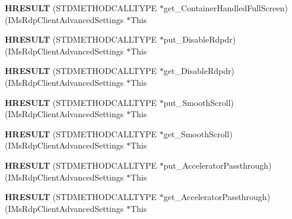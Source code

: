 \begin{DoxyCompactItemize}
{\bfseries H\+R\+E\+S\+U\+LT} (S\+T\+D\+M\+E\+T\+H\+O\+D\+C\+A\+L\+L\+T\+Y\+PE $\ast$get\+\_\+\+Container\+Handled\+Full\+Screen)(I\+Ms\+Rdp\+Client\+Advanced\+Settings $\ast$This
\item 
\mbox{\label{struct_i_ms_rdp_client_advanced_settings_vtbl_aa7242be4ace1d99f7cdfde475d4b5e1d}} 
{\bfseries H\+R\+E\+S\+U\+LT} (S\+T\+D\+M\+E\+T\+H\+O\+D\+C\+A\+L\+L\+T\+Y\+PE $\ast$put\+\_\+\+Disable\+Rdpdr)(I\+Ms\+Rdp\+Client\+Advanced\+Settings $\ast$This
\item 
\mbox{\label{struct_i_ms_rdp_client_advanced_settings_vtbl_a050b9cb3e06b18f7464e443854d50ae4}} 
{\bfseries H\+R\+E\+S\+U\+LT} (S\+T\+D\+M\+E\+T\+H\+O\+D\+C\+A\+L\+L\+T\+Y\+PE $\ast$get\+\_\+\+Disable\+Rdpdr)(I\+Ms\+Rdp\+Client\+Advanced\+Settings $\ast$This
\item 
\mbox{\label{struct_i_ms_rdp_client_advanced_settings_vtbl_a828160c02e2150009e408b023bace8b9}} 
{\bfseries H\+R\+E\+S\+U\+LT} (S\+T\+D\+M\+E\+T\+H\+O\+D\+C\+A\+L\+L\+T\+Y\+PE $\ast$put\+\_\+\+Smooth\+Scroll)(I\+Ms\+Rdp\+Client\+Advanced\+Settings $\ast$This
\item 
\mbox{\label{struct_i_ms_rdp_client_advanced_settings_vtbl_ad000ad0f469408be86941932c6eed029}} 
{\bfseries H\+R\+E\+S\+U\+LT} (S\+T\+D\+M\+E\+T\+H\+O\+D\+C\+A\+L\+L\+T\+Y\+PE $\ast$get\+\_\+\+Smooth\+Scroll)(I\+Ms\+Rdp\+Client\+Advanced\+Settings $\ast$This
\item 
\mbox{\label{struct_i_ms_rdp_client_advanced_settings_vtbl_a35b1140a0aef73c9dbda596022606fcc}} 
{\bfseries H\+R\+E\+S\+U\+LT} (S\+T\+D\+M\+E\+T\+H\+O\+D\+C\+A\+L\+L\+T\+Y\+PE $\ast$put\+\_\+\+Accelerator\+Passthrough)(I\+Ms\+Rdp\+Client\+Advanced\+Settings $\ast$This
\item 
\mbox{\label{struct_i_ms_rdp_client_advanced_settings_vtbl_af434c403b0b6fb97cc2a70d8dd3524a9}} 
{\bfseries H\+R\+E\+S\+U\+LT} (S\+T\+D\+M\+E\+T\+H\+O\+D\+C\+A\+L\+L\+T\+Y\+PE $\ast$get\+\_\+\+Accelerator\+Passthrough)(I\+Ms\+Rdp\+Client\+Advanced\+Settings $\ast$This
\item 

\end{DoxyCompactItemize}
